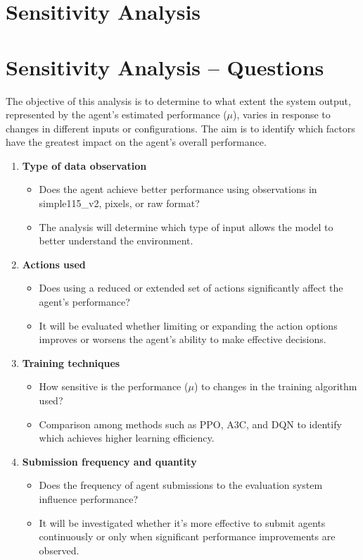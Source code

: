 \graphicspath{{jorge/}}

\section{Sensitivity Analysis}
\section*{Sensitivity Analysis – Questions}

The objective of this analysis is to determine to what extent the system output, represented by the agent’s estimated performance ($\mu$), varies in response to changes in different inputs or configurations. The aim is to identify which factors have the greatest impact on the agent’s overall performance.

\begin{enumerate}
    \item \textbf{Type of data observation}
    \begin{itemize}
        \item Does the agent achieve better performance using observations in simple115\_v2, pixels, or raw format?
        \item The analysis will determine which type of input allows the model to better understand the environment.
    \end{itemize}

    \item \textbf{Actions used}
    \begin{itemize}
        \item Does using a reduced or extended set of actions significantly affect the agent's performance?
        \item It will be evaluated whether limiting or expanding the action options improves or worsens the agent's ability to make effective decisions.
    \end{itemize}

    \item \textbf{Training techniques}
    \begin{itemize}
        \item How sensitive is the performance ($\mu$) to changes in the training algorithm used?
        \item Comparison among methods such as PPO, A3C, and DQN to identify which achieves higher learning efficiency.
    \end{itemize}

    \item \textbf{Submission frequency and quantity}
    \begin{itemize}
        \item Does the frequency of agent submissions to the evaluation system influence performance?
        \item It will be investigated whether it's more effective to submit agents continuously or only when significant performance improvements are observed.
    \end{itemize}


\end{enumerate}
